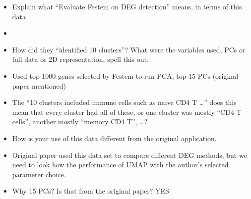 \documentclass[
  12pt]{article}
\begin{document}
\begin{itemize}
\item
  Explain what ``Evaluate Festem on DEG detection'' means, in terms of
  this data
\item
\item
  How did they ``identified 10 clusters''? What were the variables used,
  PCs or full data or 2D representation, spell this out.
\item
  Used top 1000 genes selected by Festem to run PCA, top 15 PCs
  (original paper mentioned)
\item
  The ``10 clusters included immune cells such as naive CD4 T \ldots{}''
  does this mean that every cluster had all of these, or one cluster was
  mostly ``CD4 T cells'', another mostly ``memory CD4 T'', \ldots?
\item
  How is your use of this data different from the original application.
\item
  Original paper used this data set to compare different DEG methods,
  but we need to look how the performance of UMAP with the author's
  selected parameter choice.
\item
  Why 15 PCs? Is that from the original paper? YES
\end{itemize}

\citet{Chen2023}
\end{document}
